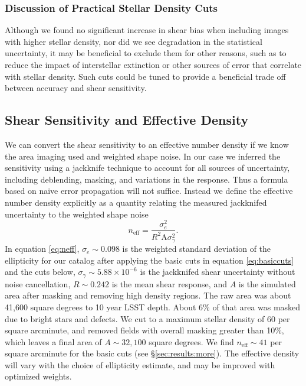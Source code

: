 \documentclass[twocolumn,twocolappendix,astrosym]{openjournal}
\begin{document}
\subsubsection{Discussion of Practical Stellar Density Cuts}

Although we found no significant increase in shear bias when including images
with higher stellar density, nor did we see degradation in the statistical
uncertainty, it may be beneficial to exclude them for other reasons, such as to
reduce the impact of interstellar extinction or other sources of error that
correlate with stellar density.  Such cuts could be tuned to provide a
beneficial trade off between accuracy and shear sensitivity.

\subsection{Shear Sensitivity and Effective Density} \label{sec:results:effdens}


We can convert the shear sensitivity to an effective number density if we know the
area imaging used and weighted shape noise.  In our case we inferred the
sensitivity using a jackknife technique to account for all sources of
uncertainty, including deblending, masking, and variations in the response.
Thus a formula based on naive error propagation will not suffice.  Instead we
define the effective number density explicitly as a quantity relating
the measured jackknifed uncertainty to the weighted shape noise
\begin{equation} \label{eq:neff}
    n_{\mathrm{eff}} = \frac{\sigma^2_{e}}{R^2 \mathrm{A} \sigma^2_{\gamma}}.
\end{equation}
In equation \ref{eq:neff}, $\sigma_e \sim 0.098$ is the weighted standard
deviation of the ellipticity for our catalog after applying the basic cuts in
equation \ref{eq:basiccuts} and the cuts below, $\sigma_\gamma \sim 5.88
\times 10^{-6}$ is the jackknifed shear uncertainty without noise cancellation,
$R \sim 0.242$ is the mean shear response, and $A$ is the simulated area after masking
and removing high density regions.    The raw area was about 41,600 square
degrees to 10 year LSST depth. About 6\% of that area was masked due to bright
stars and defects.  We cut to a maximum stellar density of 60 per square
arcminute, and removed fields with overall masking greater than 10\%, which
leaves a final area of $A \sim 32,100$ square degrees.  
We find $n_\mathrm{eff} \sim 41$ per square arcminute for the basic cuts (see
\S \ref{sec:results:more}).  The effective density will vary with the choice of
ellipticity estimate, and may be improved with optimized weights.
\end{document}
